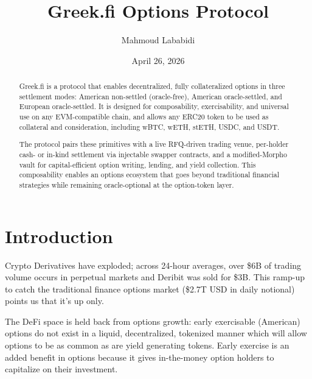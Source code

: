 \documentclass[%
 reprint,
 amsmath,amssymb,
 aps,
 prl,
floatfix,
]{revtex4-2}
\newcommand{\greekfi}{Greek.fi }
\begin{document}
\title{\greekfi Options Protocol}

\author{Mahmoud Lababidi}

\date{April 26, 2026}

\begin{abstract}
\greekfi is a protocol that enables decentralized, fully collateralized options
in three settlement modes: American non-settled (oracle-free), American oracle-settled,
and European oracle-settled.
It is designed for composability, exercisability, and universal use
on any EVM-compatible chain, and allows any ERC20 token to be used as
collateral and consideration, including wBTC, wETH, stETH, USDC, and USDT.

The protocol pairs these primitives with a live RFQ-driven trading venue,
per-holder cash- or in-kind settlement via injectable swapper contracts,
and a modified-Morpho vault for capital-efficient option writing, lending, and yield collection.
This composability enables an options ecosystem that goes beyond
traditional financial strategies while remaining oracle-optional at the option-token layer.

\end{abstract}

\maketitle

\section{Introduction}

Crypto Derivatives have exploded; across 24-hour averages, 
over \$6B of trading volume occurs in perpetual markets and Deribit was sold for \$3B. 
This ramp-up to catch the traditional finance options market (\$2.7T USD in daily notional)
points us that it's up only.

The DeFi space is held back from options growth: early exercisable (American) options do not exist in a liquid, decentralized, tokenized manner which will allow options to be as common as are yield generating tokens. 
Early exercise is an added benefit in options because it gives in-the-money option holders to capitalize on their investment.
\end{document}
